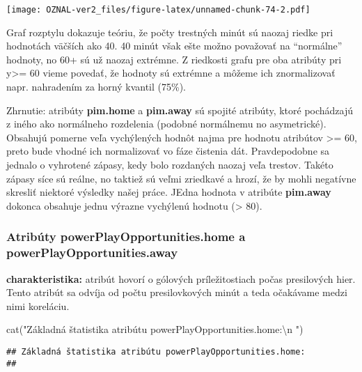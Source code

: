 \documentclass[
]{article}
\newenvironment{Shaded}{\begin{snugshade}}{\end{snugshade}}
\newcommand{\FunctionTok}[1]{\textcolor[rgb]{0.00,0.00,0.00}{#1}}
\newcommand{\NormalTok}[1]{#1}
\newcommand{\SpecialCharTok}[1]{\textcolor[rgb]{0.00,0.00,0.00}{#1}}
\newcommand{\StringTok}[1]{\textcolor[rgb]{0.31,0.60,0.02}{#1}}
\begin{document}
\texttt{[image: OZNAL-ver2\_files/figure-latex/unnamed-chunk-74-2.pdf]}

Graf rozptylu dokazuje teóriu, že počty trestných minút sú naozaj riedke
pri hodnotách väčších ako 40. 40 minút však ešte možno považovať na
``normálne'' hodnoty, no 60+ sú už naozaj extrémne. Z riedkosti grafu
pre oba atribúty pri y\textgreater= 60 vieme povedať, že hodnoty sú
extrémne a môžeme ich znormalizovať napr. nahradením za horný kvantil
(75\%).

Zhrnutie: atribúty \textbf{pim.home} a \textbf{pim.away} sú spojité
atribúty, ktoré pochádzajú z iného ako normálneho rozdelenia (podobné
normálnemu no asymetrické). Obsahujú pomerne veľa vychýlených hodnôt
najma pre hodnotu atribútov \textgreater= 60, preto bude vhodné ich
normalizovať vo fáze čistenia dát. Pravdepodobne sa jednalo o vyhrotené
zápasy, kedy bolo rozdaných naozaj veľa trestov. Takéto zápasy síce sú
reálne, no taktiež sú veľmi zriedkavé a hrozí, že by mohli negatívne
skresliť niektoré výsledky našej práce. JEdna hodnota v atribúte
\textbf{pim.away} dokonca obsahuje jednu výrazne vychýlenú hodnotu
(\textgreater{} 80).

\hypertarget{atribuxfaty-powerplayopportunities.home-a-powerplayopportunities.away}{%
\subsubsection{Atribúty powerPlayOpportunities.home a
powerPlayOpportunities.away}\label{atribuxfaty-powerplayopportunities.home-a-powerplayopportunities.away}}

\textbf{charakteristika:} atribút hovorí o gólových príležitostiach
počas presilových hier. Tento atribút sa odvíja od počtu presilovkových
minút a teda očakávame medzi nimi koreláciu.

\begin{Shaded}
\begin{Highlighting}[]
\FunctionTok{cat}\NormalTok{(}\StringTok{"Základná štatistika atribútu powerPlayOpportunities.home:}\SpecialCharTok{\textbackslash{}n}\StringTok{ "}\NormalTok{)}
\end{Highlighting}
\end{Shaded}

\begin{verbatim}
## Základná štatistika atribútu powerPlayOpportunities.home:
## 
\end{verbatim}

\begin{Shaded}
\end{Shaded}
\end{document}
